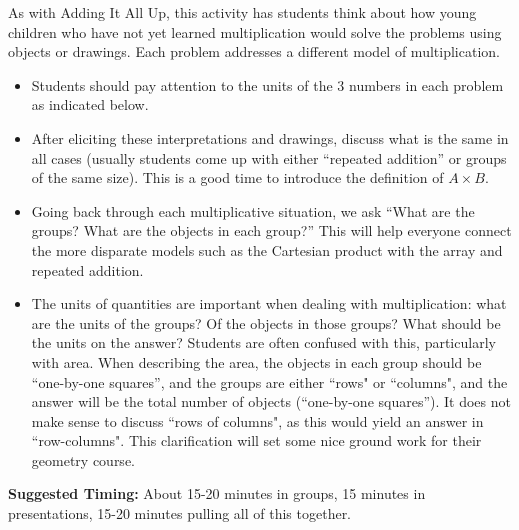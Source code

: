 \documentclass{ximera}
\begin{document}
\newpage
\begin{instructorNotes}
As with Adding It All Up, this activity has students think about how young children who have not yet learned multiplication would solve the problems using objects or drawings.  Each problem addresses a different model of multiplication. 

\begin{itemize}
	\item Students should pay attention to the units of the 3 numbers in each problem as indicated below.
	\item After eliciting these interpretations and drawings, discuss what is the same in all cases (usually students come up with either ``repeated addition'' or groups of the same size).  This is a good time to introduce the definition of $A\times B$.  
	\item Going back through each multiplicative situation, we ask ``What are the groups? What are the objects in each group?''  This will help everyone connect the more disparate models such as the Cartesian product with the array and repeated addition.  
	\item The units of quantities are important when dealing with multiplication: what are the units of the groups?  Of the objects in those groups?  What should be the units on the answer?  Students are often confused with this, particularly with area.  When describing the area, the objects in each group should be ``one-by-one squares'', and the groups are either ``rows" or ``columns", and the answer will be the total number of objects (``one-by-one squares''). It does not make sense to discuss ``rows of columns", as this would yield an answer in ``row-columns". This clarification will set some nice ground work for their geometry course.
\end{itemize}




{\bf Suggested Timing:} About 15-20 minutes in groups, 15 minutes in presentations, 15-20 minutes pulling all of this together.
\end{instructorNotes}
\end{document}
